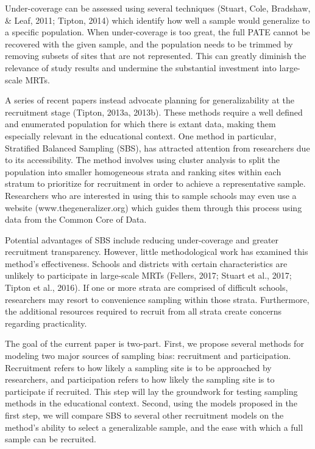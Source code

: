 \documentclass[man,floatsintext]{apa6}
\begin{document}
Under-coverage can be assessed using several techniques (Stuart, Cole, Bradshaw, \& Leaf, 2011; Tipton, 2014) which identify how well a sample would generalize to a specific population. When under-coverage is too great, the full PATE cannot be recovered with the given sample, and the population needs to be trimmed by removing subsets of sites that are not represented. This can greatly diminish the relevance of study results and undermine the substantial investment into large-scale MRTs.

A series of recent papers instead advocate planning for generalizability at the recruitment stage (Tipton, 2013a, 2013b). These methods require a well defined and enumerated population for which there is extant data, making them especially relevant in the educational context. One method in particular, Stratified Balanced Sampling (SBS), has attracted attention from researchers due to its accessibility. The method involves using cluster analysis to split the population into smaller homogeneous strata and ranking sites within each stratum to prioritize for recruitment in order to achieve a representative sample. Researchers who are interested in using this to sample schools may even use a website (www.thegeneralizer.org) which guides them through this process using data from the Common Core of Data.

Potential advantages of SBS include reducing under-coverage and greater recruitment transparency. However, little methodological work has examined this method's effectiveness. Schools and districts with certain characteristics are unlikely to participate in large-scale MRTs (Fellers, 2017; Stuart et al., 2017; Tipton et al., 2016). If one or more strata are comprised of difficult schools, researchers may resort to convenience sampling within those strata. Furthermore, the additional resources required to recruit from all strata create concerns regarding practicality.

The goal of the current paper is two-part. First, we propose several methods for modeling two major sources of sampling bias: recruitment and participation. Recruitment refers to how likely a sampling site is to be approached by researchers, and participation refers to how likely the sampling site is to participate if recruited. This step will lay the groundwork for testing sampling methods in the educational context. Second, using the models proposed in the first step, we will compare SBS to several other recruitment models on the method's ability to select a generalizable sample, and the ease with which a full sample can be recruited.
\end{document}

